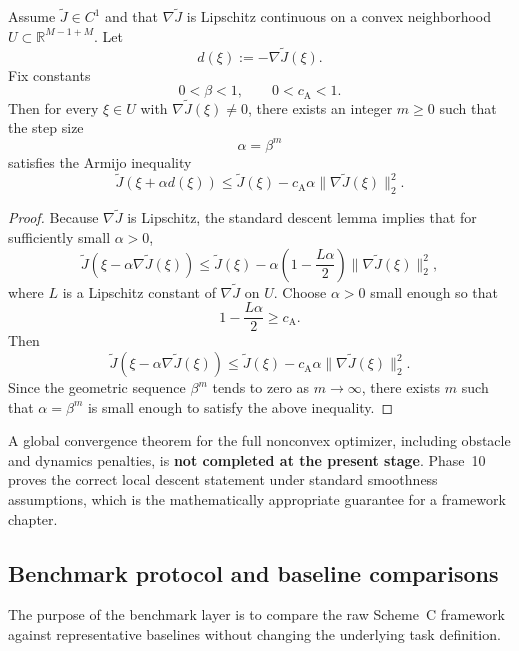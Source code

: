\begin{theorem}
\label{thm:phase10_armijo}
Assume \(\widetilde J\in C^1\) and that \(\nabla \widetilde J\) is Lipschitz continuous on a convex neighborhood \(U\subset\mathbb R^{M-1+M}\).
Let
\[
d(\xi):=-\nabla \widetilde J(\xi).
\]
Fix constants
\[
0<\beta<1,
\qquad
0<c_{\mathrm{A}}<1.
\]
Then for every \(\xi\in U\) with \(\nabla \widetilde J(\xi)\neq 0\), there exists an integer \(m\ge 0\) such that the step size
\[
\alpha=\beta^m
\]
satisfies the Armijo inequality
\begin{equation}
\label{eq:phase10_armijo}
\widetilde J(\xi+\alpha d(\xi))
\le
\widetilde J(\xi)-c_{\mathrm{A}}\alpha\|\nabla \widetilde J(\xi)\|_2^2.
\end{equation}
\end{theorem}

\begin{proof}
Because \(\nabla\widetilde J\) is Lipschitz, the standard descent lemma implies that for sufficiently small \(\alpha>0\),
\[
\widetilde J(\xi-\alpha \nabla \widetilde J(\xi))
\le
\widetilde J(\xi)
-
\alpha\left(1-\frac{L\alpha}{2}\right)\|\nabla \widetilde J(\xi)\|_2^2,
\]
where \(L\) is a Lipschitz constant of \(\nabla\widetilde J\) on \(U\).
Choose \(\alpha>0\) small enough so that
\[
1-\frac{L\alpha}{2}\ge c_{\mathrm{A}}.
\]
Then
\[
\widetilde J(\xi-\alpha \nabla \widetilde J(\xi))
\le
\widetilde J(\xi)-c_{\mathrm{A}}\alpha\|\nabla \widetilde J(\xi)\|_2^2.
\]
Since the geometric sequence \(\beta^m\) tends to zero as \(m\to\infty\), there exists \(m\) such that \(\alpha=\beta^m\) is small enough to satisfy the above inequality.
\end{proof}

\begin{remark}
\label{rem:phase10_global_conv_status}
A global convergence theorem for the full nonconvex optimizer, including obstacle and dynamics penalties, is \textbf{not completed at the present stage}.
Phase~10 proves the correct local descent statement under standard smoothness assumptions, which is the mathematically appropriate guarantee for a framework chapter.
\end{remark}

\subsection{Benchmark protocol and baseline comparisons}
\label{subsec:phase10_benchmark}

The purpose of the benchmark layer is to compare the raw Scheme~C framework against representative baselines without changing the underlying task definition.

